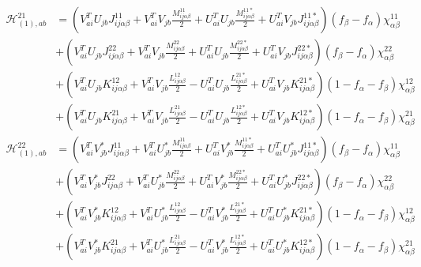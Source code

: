 \begin{align}
\mathcal{H}_{(1),ab}^{21} 
&= \left(V^T_{ai} U_{jb} J_{ij\alpha\beta}^{11} + V_{ai}^T V_{jb} \frac{M_{ij\alpha\beta}^{11}}{2} + U_{ai}^T U_{jb} \frac{M_{ij\alpha\beta}^{11*}}{2} + U_{ai}^T V_{jb} J_{ij\alpha\beta}^{11*}  \right)(f_\beta-f_\alpha)\chi^{11}_{\alpha\beta}                   \\
&+ \left(V_{ai}^T U_{jb} J_{ij\alpha\beta}^{22} + V_{ai}^T V_{jb} \frac{M_{ij\alpha\beta}^{22}}{2} + U_{ai}^T U_{jb} \frac{M_{ij\alpha\beta}^{22*}}{2} + U_{ai}^T V_{jb} J_{ij\alpha\beta}^{22*}  \right)(f_\beta-f_\alpha)\chi^{22}_{\alpha\beta}                   \\
&+ \left(V_{ai}^T U_{jb} K_{ij\alpha\beta}^{12} + V_{ai}^T V_{jb} \frac{L_{ij\alpha\beta}^{12}}{2} - U_{ai}^T U_{jb} \frac{L_{ij\alpha\beta}^{21*}}{2} + U_{ai}^T V_{jb} K_{ij\alpha\beta}^{21*}  \right)\left(1-f_\alpha-f_\beta\right)\chi^{12}_{\alpha\beta}      \\
&+ \left(V_{ai}^T U_{jb} K_{ij\alpha\beta}^{21} + V_{ai}^T V_{jb} \frac{L_{ij\alpha\beta}^{21}}{2} - U_{ai}^T U_{jb} \frac{L_{ij\alpha\beta}^{12*}}{2} + U_{ai}^T V_{jb} K_{ij\alpha\beta}^{12*}  \right)\left(1-f_\alpha-f_\beta\right)\chi^{21}_{\alpha\beta}
\end{align}
\begin{align}
\mathcal{H}_{(1),ab}^{22} 
&= \left(V_{ai}^T V^*_{jb} J_{ij\alpha\beta}^{11} + V_{ai}^T U^*_{jb} \frac{M_{ij\alpha\beta}^{11}}{2} + U_{ai}^T V^*_{jb} \frac{M_{ij\alpha\beta}^{11*}}{2} + U_{ai}^T U^*_{jb} J_{ij\alpha\beta}^{11*}  \right)(f_\beta-f_\alpha)\chi^{11}_{\alpha\beta}                   \\
&+ \left(V_{ai}^T V^*_{jb} J_{ij\alpha\beta}^{22} + V_{ai}^T U^*_{jb} \frac{M_{ij\alpha\beta}^{22}}{2} + U_{ai}^T V^*_{jb} \frac{M_{ij\alpha\beta}^{22*}}{2} + U_{ai}^T U^*_{jb} J_{ij\alpha\beta}^{22*}  \right)(f_\beta-f_\alpha)\chi^{22}_{\alpha\beta}                   \\
&+ \left(V_{ai}^T V^*_{jb} K_{ij\alpha\beta}^{12} + V_{ai}^T U^*_{jb} \frac{L_{ij\alpha\beta}^{12}}{2} - U_{ai}^T V^*_{jb} \frac{L_{ij\alpha\beta}^{21*}}{2} + U_{ai}^T U^*_{jb} K_{ij\alpha\beta}^{21*}  \right)\left(1-f_\alpha-f_\beta\right)\chi^{12}_{\alpha\beta}      \\
&+ \left(V_{ai}^T V^*_{jb} K_{ij\alpha\beta}^{21} + V_{ai}^T U^*_{jb} \frac{L_{ij\alpha\beta}^{21}}{2} - U_{ai}^T V^*_{jb} \frac{L_{ij\alpha\beta}^{12*}}{2} + U_{ai}^T U^*_{jb} K_{ij\alpha\beta}^{12*}  \right)\left(1-f_\alpha-f_\beta\right)\chi^{21}_{\alpha\beta}
\end{align}

